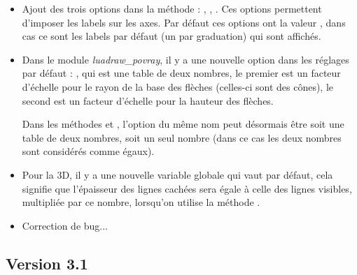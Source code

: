 \begin{itemize}
    \item Ajout des trois options dans la méthode  : , , . Ces options permettent d'imposer les labels sur les axes. Par défaut ces options ont la valeur \nil, dans cas ce sont les labels par défaut (un par graduation) qui sont affichés.

    \item Dans le module \emph{luadraw\_povray}, il y a une nouvelle option dans les réglages par défaut : , qui est une table de deux nombres, le premier est un facteur d'échelle pour le rayon de la base des flèches (celles-ci sont des cônes), le second est un facteur d'échelle pour la hauteur des flèches.
    
    Dans les méthodes  et , l'option du même nom peut désormais être soit une table de deux nombres, soit un seul nombre (dans ce cas les deux nombres sont considérés comme égaux).
    
    \item Pour la 3D, il y a une nouvelle variable globale  qui vaut  par défaut, cela signifie que l'épaisseur des lignes cachées sera égale à celle des lignes visibles, multipliée par ce nombre, lorsqu'on utilise la méthode .
    
    \item Correction de bug...
\end{itemize}

\subsection{Version 3.1}

